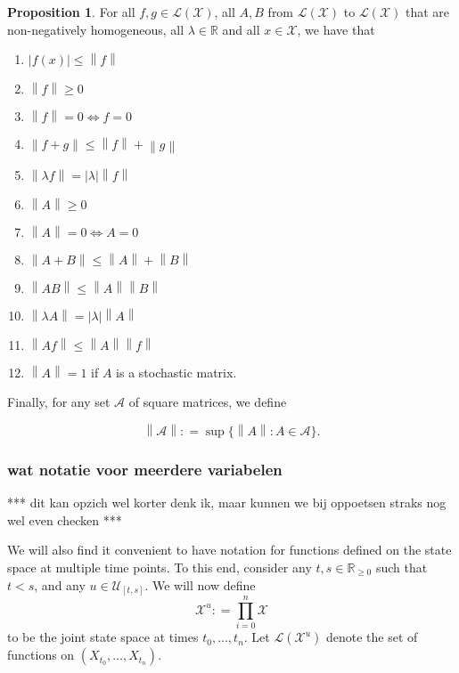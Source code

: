 \documentclass[10pt]{paper}
\theoremstyle{definition}
\newtheorem{proposition}[theorem]{Proposition}
\newcommand{\reals}{\mathbb{R}}
\newcommand{\realsnonneg}{\reals_{\geq 0}}
\newcommand{\states}{\mathcal{X}}
\newcommand{\gambles}{\mathcal{L}}
\newcommand{\gamblesX}{\gambles(\states)}
\newcommand{\asa}{\Leftrightarrow}
\newcommand{\norm}[1]{\left\lVert #1 \right\rVert}
\newcommand{\abs}[1]{\left\vert #1 \right\vert}
\newcommand{\coloneqq}{:\!=}
\begin{document}
\begin{proposition}
For all $f,g\in\gamblesX$, all $A,B$ from $\gamblesX$ to $\gamblesX$ that are non-negatively homogeneous, all $\lambda\in\reals$ and all $x\in\states$, we have that
\vspace{5pt}

\begin{enumerate}[label=N\arabic*:,ref=N\arabic*]
\item
$\abs{f(x)}\leq\norm{f}$
\item
$\norm{f}\geq0$
\item
$\norm{f}=0\asa f=0$
\item
$\norm{f+g}\leq\norm{f}+\norm{g}$
\item
$\norm{\lambda f}=\abs{\lambda}\norm{f}$
\item
$\norm{A}\geq0$
\item
$\norm{A}=0\asa A=0$
\item
$\norm{A+B}\leq\norm{A}+\norm{B}$
\item
$\norm{AB}\leq\norm{A}\norm{B}$
\item
$\norm{\lambda A}=\abs{\lambda}\norm{A}$
\item\label{N:normAf}
$\norm{Af}\leq\norm{A}\norm{f}$
\item
$\norm{A}=1$ if $A$ is a stochastic matrix.
\end{enumerate}
\vspace{5pt}
\end{proposition}

\noindent
Finally, for any set $\mathcal{A}$ of square matrices, we define

\begin{equation*}
\norm{\mathcal{A}}\coloneqq\sup\{\norm{A}\colon A\in\mathcal{A}\}.
\end{equation*}

\subsubsection{wat notatie voor meerdere variabelen}\label{sec:multivar_notation}

*** dit kan opzich wel korter denk ik, maar kunnen we bij oppoetsen straks nog wel even checken ***

We will also find it convenient to have notation for functions defined on the state space at multiple time points.
To this end, consider any $t,s\in\realsnonneg$ such that $t<s$, and any $u\in\mathcal{U}_{[t,s]}$. We will now define
\begin{equation*}
\states^u\coloneqq \prod_{i=0}^n\states
\end{equation*}
to be the joint state space at times $t_0,\ldots,t_n$. Let $\gambles(\states^u)$ denote the set of functions on $(X_{t_0},\ldots,X_{t_n})$.
\end{document}
